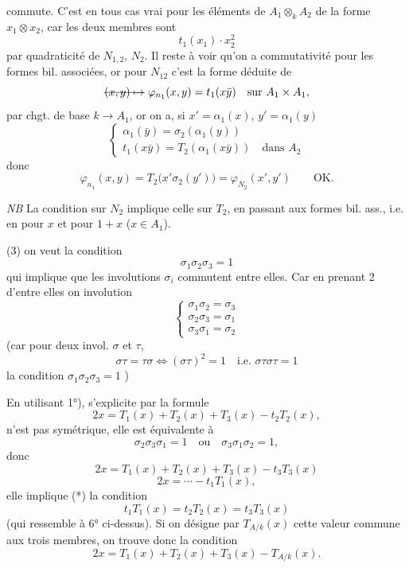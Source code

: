 \documentclass[11pt,a4paper]{article}
\begin{document}
commute. C'est en tous cas vrai pour les éléments  de $A_1 \otimes_k A_2$ de la forme $x_1 \otimes x_2$, car les deux membres sont 
\[
  t_1(x_1) \cdot x_2^2
\]
par quadraticité de $N_{1,2}$, $N_2$. Il reste à voir qu'on a commutativité pour les  formes bil. associées, or pour $N_{12}$ c'est la forme déduite de
\[
  \text{\struck{$(x,y) \mapsto$}}\ \varphi_{n_1}(x, y) = t_1(x \bar{y}) \quad \text{sur } A_1 \times A_1 ,
\]
par chgt. de base $k \to A_1$, or on a, si $x' = \alpha_1(x)$, $y' = \alpha_1(y)$
\[
  \begin{cases}
    \alpha_1(\bar{y}) = \sigma_2(\alpha_1(y)) \\
    t_1(x \bar{y}) = T_2(\alpha_1(x\bar{y})) \quad \text{dans } A_2
  \end{cases}
\]
donc
\[
  \varphi_{n_1}(x, y) = T_2\bigl(x' \sigma_2(y')\bigr) = \varphi_{N_2}(x', y') \qquad \text{OK.}
\]

\emph{NB} La condition sur $N_2$ implique celle sur $T_2$, en passant aux formes bil. ass., i.e. en  pour $x$ et pour $1 + x$ ($x \in A_1$).

(3)  on veut la condition
\[
  \sigma_1 \sigma_2 \sigma_3 = 1
\]
qui implique que les involutions $\sigma_i$ commutent entre elles. Car en prenant 2 d'entre elles on  involution
\[
  \begin{cases}
    \sigma_1 \sigma_2 = \sigma_3 \\
    \sigma_2 \sigma_3 = \sigma_1 \\
    \sigma_3 \sigma_1 = \sigma_2
  \end{cases}
\]
(car pour deux invol. $\sigma$ et $\tau$,
\[
  \sigma\tau = \tau\sigma \iff (\sigma\tau)^2 = 1 \quad \text{i.e. } \sigma\tau\sigma\tau = 1
\]
la condition $\sigma_1 \sigma_2 \sigma_3 = 1$ \ill{})

En utilisant 1°), \struck{\ill{}} s'explicite par la formule
\[
  2x = T_1(x) + T_2(x) + T_3(x) - t_2 T_2(x) ,
\]
 n'est pas symétrique,  elle est équivalente à
\[
  \sigma_2 \sigma_3 \sigma_1 = 1 \quad \text{ou} \quad \sigma_3 \sigma_1 \sigma_2 = 1 ,
\]
donc
\[
  2x = T_1(x) + T_2(x) + T_3(x) - t_3 T_3(x)
\]
\[
  2x = \cdots - t_1 T_1(x) ,
\]
elle implique (*) la condition
\[
  t_1 T_1(x) = t_2 T_2(x) = t_3 T_3(x)
\]
(qui ressemble à 6° ci-dessus). Si on désigne par $T_{A/k}(x)$ cette valeur commune aux trois membres, on trouve donc la condition
\[
  2x = T_1(x) + T_2(x) + T_3(x) - T_{A/k}(x) .
\]
\end{document}
